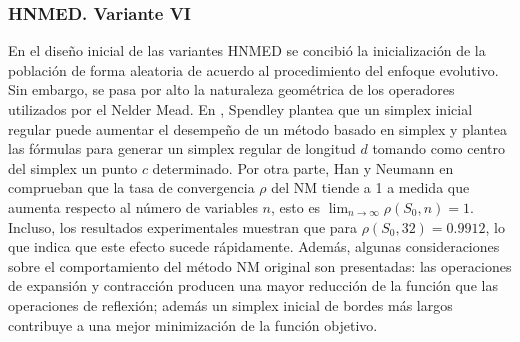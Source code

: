 \subsubsection{HNMED. Variante VI}
En el diseño inicial de las variantes HNMED se concibió la inicialización de la población de forma aleatoria de acuerdo al procedimiento del enfoque evolutivo. Sin embargo, se pasa por alto la naturaleza geométrica de los operadores utilizados por el Nelder Mead. En \cite{spendley_sequential_1962}, Spendley plantea que un simplex inicial regular puede aumentar el desempeño de un método basado en simplex y plantea las fórmulas para generar un simplex regular de longitud $d$ tomando como centro del simplex un punto $c$ determinado. Por otra parte, Han y Neumann en \cite{han_effect_2006} comprueban que la tasa de convergencia $\rho$ del NM tiende a 1 a medida que aumenta respecto al número de variables $n$, esto es $ \lim_{n\to\infty}\rho(S_0,n)=1$. Incluso, los resultados experimentales muestran que para $\rho(S_0,32)=0.9912$, lo que indica que este efecto sucede rápidamente. Además, algunas consideraciones sobre el comportamiento del método NM original son presentadas: las operaciones de expansión y contracción producen una mayor reducción de la función que las operaciones de reflexión; además un simplex inicial de bordes más largos contribuye a una mejor minimización de la función objetivo. 

